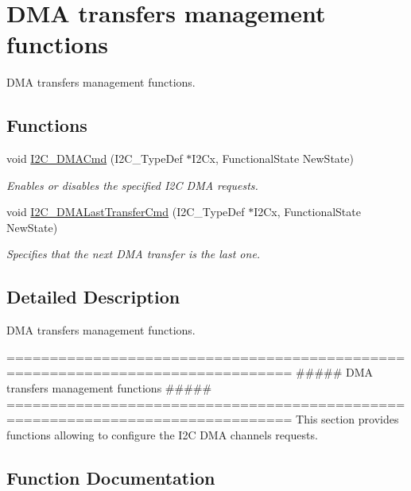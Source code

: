 \hypertarget{group___i2_c___group4}{}\section{D\+MA transfers management functions}
\label{group___i2_c___group4}


D\+MA transfers management functions.  


\subsection*{Functions}
\begin{DoxyCompactItemize}
\item 
void \mbox{\hyperlink{group___i2_c___group4_ga38502ce11e5ec923e0f6476aaa35b45c}{I2\+C\+\_\+\+D\+M\+A\+Cmd}} (I2\+C\+\_\+\+Type\+Def $\ast$I2\+Cx, Functional\+State New\+State)
\begin{DoxyCompactList}\small\item\em Enables or disables the specified I2C D\+MA requests. \end{DoxyCompactList}\item 
void \mbox{\hyperlink{group___i2_c___group4_gab2e994c5681eb6ec7c26a03ffe1de060}{I2\+C\+\_\+\+D\+M\+A\+Last\+Transfer\+Cmd}} (I2\+C\+\_\+\+Type\+Def $\ast$I2\+Cx, Functional\+State New\+State)
\begin{DoxyCompactList}\small\item\em Specifies that the next D\+MA transfer is the last one. \end{DoxyCompactList}\end{DoxyCompactItemize}


\subsection{Detailed Description}
D\+MA transfers management functions. 

\begin{DoxyVerb} ===============================================================================
                ##### DMA transfers management functions #####
 ===============================================================================  
  This section provides functions allowing to configure the I2C DMA channels 
  requests.\end{DoxyVerb}
 

\subsection{Function Documentation}
\mbox{\label{group___i2_c___group4_ga38502ce11e5ec923e0f6476aaa35b45c}} 
